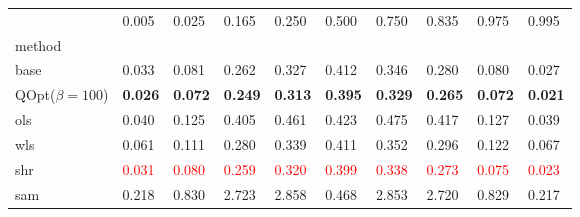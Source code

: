 \begin{tabular}{llllllllll}
\toprule
 & 0.005 & 0.025 & 0.165 & 0.250 & 0.500 & 0.750 & 0.835 & 0.975 & 0.995 \\
method &  &  &  &  &  &  &  &  &  \\
\midrule
base & 0.033 & 0.081 & 0.262 & 0.327 & 0.412 & 0.346 & 0.280 & 0.080 & 0.027 \\
\midrule
QOpt($\beta=100$) & \textbf{0.026} & \textbf{0.072} & \textbf{0.249} & \textbf{0.313} & \textbf{0.395} & \textbf{0.329} & \textbf{0.265} & \textbf{0.072} & \textbf{0.021} \\
ols & 0.040 & 0.125 & 0.405 & 0.461 & 0.423 & 0.475 & 0.417 & 0.127 & 0.039 \\
wls & 0.061 & 0.111 & 0.280 & 0.339 & 0.411 & 0.352 & 0.296 & 0.122 & 0.067 \\
shr & \textcolor{red}{0.031} & \textcolor{red}{0.080} & \textcolor{red}{0.259} & \textcolor{red}{0.320} & \textcolor{red}{0.399} & \textcolor{red}{0.338} & \textcolor{red}{0.273} & \textcolor{red}{0.075} & \textcolor{red}{0.023} \\
sam & 0.218 & 0.830 & 2.723 & 2.858 & 0.468 & 2.853 & 2.720 & 0.829 & 0.217 \\
\bottomrule
\end{tabular}